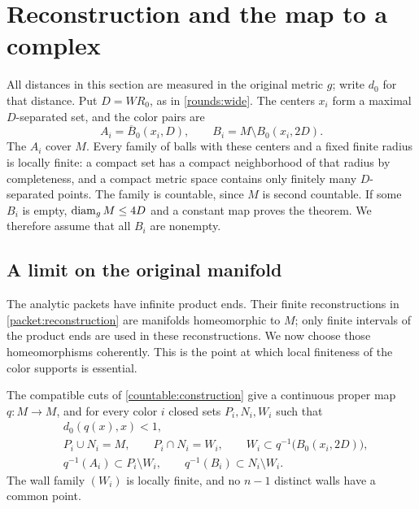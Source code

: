 \section{Reconstruction and the map to a complex}\label{sec:reconstruction}

All distances in this section are measured in the original metric $g$;
write $d_0$ for that distance.  Put $D=WR_0$, as in
\cref{rounds:wide}.  The centers $x_i$ form a maximal $D$-separated set,
and the color pairs are
\[
 A_i=\overline B_0(x_i,D),\qquad
 B_i=M\setminus B_0(x_i,2D).
\]
The $A_i$ cover $M$.  Every family of balls with these centers and a
fixed finite radius is locally finite: a compact set has a compact
neighborhood of that radius by completeness, and a compact metric
space contains only finitely many $D$-separated points.  The family is
countable, since $M$ is second countable.  If some $B_i$ is empty,
$\operatorname{diam}_{g}M\le 4D$ and a constant map proves the theorem.  We therefore
assume that all $B_i$ are nonempty.

\subsection{A limit on the original manifold}

The analytic packets have infinite product ends.  Their finite
reconstructions in \cref{packet:reconstruction} are manifolds
homeomorphic to $M$; only finite intervals of the product ends are used
in these reconstructions.  We now choose those homeomorphisms
coherently.  This is the point at which local finiteness of the color
supports is essential.

\begin{proposition}\label{topology:partitions}
The compatible cuts of \cref{countable:construction} give a continuous
proper map $q:M\to M$, and for every color $i$ closed sets $P_i,N_i,W_i$
such that
\begin{align}
 &d_0(q(x),x)<1,\label{topology:displacement}\\
 &P_i\cup N_i=M,\qquad P_i\cap N_i=W_i,
   \qquad W_i\subset q^{-1}\bigl(B_0(x_i,2D)\bigr),
   \label{topology:sides}\\
 &q^{-1}(A_i)\subset P_i\setminus W_i,
   \qquad q^{-1}(B_i)\subset N_i\setminus W_i.
   \label{topology:forced}
\end{align}
The wall family $(W_i)$ is locally finite, and no $n-1$ distinct walls
have a common point.
\end{proposition}

